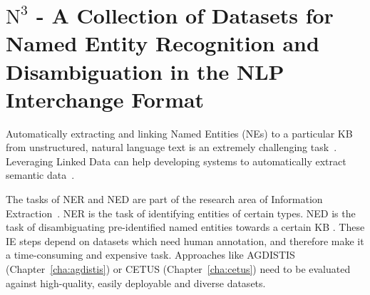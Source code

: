 \chapter[$\mbox{N}^3$ - A Collection of Datasets for NER and NED in NIF]{$\mbox{N}^3$ - A Collection of Datasets for Named Entity Recognition and Disambiguation in the NLP Interchange Format}
\label{cha:N3}


Automatically extracting and linking Named Entities (NEs) to a particular \ac{KB}  from unstructured, natural language text is an extremely challenging task~\cite{Cucerzan07}. 
Leveraging Linked Data can help developing systems to automatically extract semantic data~\cite{GER+13,AIDA,spotlight,agdistis_iswc}.

The tasks of \ac{NER}  and \ac{NED}  are part of the research area of Information Extraction~\cite{FOX}.
NER is the task of identifying entities of certain types.
NED is the task of disambiguating pre-identified named entities towards a certain \ac{KB} .
These IE steps depend on datasets which need human annotation, and therefore make it a time-consuming and expensive task.
Approaches like AGDISTIS (Chapter~\ref{cha:agdistis}) or CETUS (Chapter~\ref{cha:cetus}) need to be evaluated against high-quality, easily deployable and diverse datasets.

